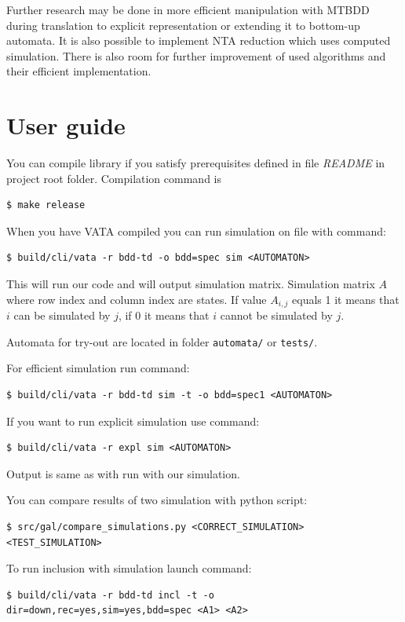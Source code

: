 \documentclass[a4paper, 12pt]{article}
\begin{document}
Further research may be done in more efficient manipulation with MTBDD during translation to explicit representation or
extending it to bottom-up automata.
It is also possible to implement NTA reduction which uses computed simulation.
There is also room for further improvement of used algorithms and their efficient implementation.

\newpage
\appendix
\section{User guide}
\label{app:usage}

You can compile library if you satisfy prerequisites defined in file \textit{README} in project root folder. Compilation command is
\begin{verbatim}
$ make release
\end{verbatim}

When you have VATA compiled you can run simulation on file with command:
\begin{verbatim}
$ build/cli/vata -r bdd-td -o bdd=spec sim <AUTOMATON>
\end{verbatim}
This will run our code and will output simulation matrix. Simulation matrix $A$ where row index and column index are states. If value $A_{i,j}$ equals 1 it means that $i$ can be simulated by $j$, if 0 it means that $i$ cannot be simulated by $j$.

Automata for try-out are located in folder \texttt{automata/} or \texttt{tests/}.

For efficient simulation run command:
\begin{verbatim}
$ build/cli/vata -r bdd-td sim -t -o bdd=spec1 <AUTOMATON>
\end{verbatim}

If you want to run explicit simulation use command:
\begin{verbatim}
$ build/cli/vata -r expl sim <AUTOMATON>
\end{verbatim}
Output is same as with run with our simulation.

You can compare results of two simulation with python script:
\begin{verbatim}
$ src/gal/compare_simulations.py <CORRECT_SIMULATION> <TEST_SIMULATION>
\end{verbatim}

To run inclusion with simulation launch command:
\begin{verbatim}
$ build/cli/vata -r bdd-td incl -t -o dir=down,rec=yes,sim=yes,bdd=spec <A1> <A2>
\end{verbatim}
\end{document}
